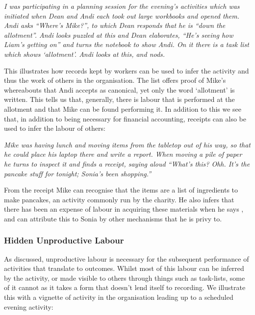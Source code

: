 \textit{I was participating in a planning session for the evening's activities which was initiated when Dean and Andi each took out large workbooks and opened them. Andi asks ``Where's Mike?'', to which Dean responds that he is ``down the allotment''. Andi looks puzzled at this and Dean elaborates, ``He's seeing how Liam's getting on'' and turns the notebook to show Andi. On it there is a task list which shows `allotment'. Andi looks at this, and nods.}

This illustrates how records kept by workers can be used to infer the activity and thus the work of others in the organisation. The list offers proof of Mike's whereabouts that Andi accepts as canonical, yet only the word `allotment' is written. This tells us that, generally, there is labour that is performed at the allotment and that Mike can be found performing it. In addition to this we see that, in addition to being necessary for financial accounting, receipts can also be used to infer the labour of others:

\textit{Mike was having lunch and moving items from the tabletop out of his way, so that he could place his laptop there and write a report. When moving a pile of paper he turns to inspect it and finds a receipt, saying aloud ``What's this? Ohh. It's the pancake stuff for tonight; Sonia's been shopping.''}

From the receipt Mike can recognise that the items are a list of ingredients to make pancakes, an activity commonly run by the charity. He also infers that there has been an expense of labour in acquiring these materials when he says , and can attribute this to Sonia by other mechanisms that he is privy to.


\subsubsection{Hidden Unproductive Labour}
As discussed, unproductive labour is necessary for the subsequent performance of activities that translate to outcomes. Whilst most of this labour can be inferred by the activity, or made visible to others through things such as task-lists, some of it cannot as it takes a form that doesn't lend itself to recording. We illustrate this with a vignette of activity in the organisation leading up to a scheduled evening activity:

